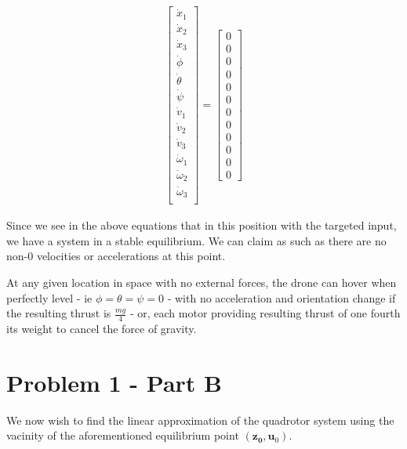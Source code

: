 \documentclass{article}
\begin{document}
\begin{equation}
    \begin{aligned}
        \begin{bmatrix}
            \dot{x}_1 \\ \dot{x}_2 \\ \dot{x}_3 \\
            \dot{\phi} \\ \dot{\theta} \\ \dot{\psi} \\
            \dot{v}_1 \\ \dot{v}_2 \\ \dot{v}_3 \\
            \dot{\omega}_1 \\ \dot{\omega}_2 \\ \dot{\omega}_3 \\
        \end{bmatrix}
        = 
        \begin{bmatrix}
            0 \\ 0 \\ 0 \\ 0 \\ 0 \\ 0 \\ 0 \\ 0 \\ 0 \\ 0 \\ 0 \\ 0
        \end{bmatrix}
    \end{aligned}
\end{equation}

Since we see in the above equations that in this position with the targeted input, we have a system in a stable equilibrium. We can claim as such as there are no non-$0$ velocities or accelerations at this point.

At any given location in space with no external forces, the drone can hover when perfectly level - ie $\phi=\theta=\psi=0$ - with no acceleration and orientation change if the resulting thrust is $\frac{mg}{4}$ - or, each motor providing resulting thrust of one fourth its weight to cancel the force of gravity.

\section*{Problem 1 - Part B}

We now wish to find the linear approximation of the quadrotor system using the vacinity of the aforementioned equilibrium point $(\boldsymbol{z_0}, \boldsymbol{u}_0)$.
\end{document}
